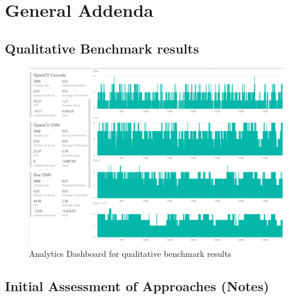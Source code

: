 \chapter{General Addenda}
\section{Qualitative Benchmark results}
\begin{figure}[H]
\centering
\includegraphics[width=\columnwidth]{media/qualitativebenchmark.png}
\caption{Analytics Dashboard for qualitative benchmark results}
\label{fig:pbidashboard}
\end{figure}

\section{Initial Assessment of Approaches (Notes)}
